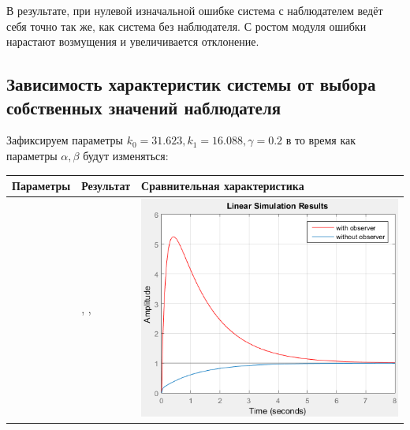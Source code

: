 \documentclass[14pt,a4paper,report]{report}
\begin{document}
В результате, при нулевой изначальной ошибке система с наблюдателем ведёт себя точно так же, как система без наблюдателя. С ростом модуля ошибки нарастают возмущения и увеличивается отклонение.

\subsection{Зависимость характеристик системы от выбора собственных значений наблюдателя}

Зафиксируем параметры $k_0=31.623, k_1=16.088, \gamma=0.2$  в то время как параметры $\alpha, \beta$ будут изменяться:

\begin{table}[h!]
	\centering
	\bgroup
	\def\arraystretch{3}
	\begin{tabular}{ | m{4cm} | m{4cm} | m{8cm} | }
		\hline
		Параметры & Результат & Сравнительная характеристика \\ \hline
		
		\text{$k_0=31.623$, $k_1=16.088$}\linebreak \text{$\alpha=-4$, $\beta=-8$, $\gamma=0.2$} & 
		\text{С наблюдателем:}\linebreak
		\text{$\Omega=5.6401$}, \text{$min(|Re(p_{1-4})|)=0.7846$} 
		\text{Без наблюдателя:}\linebreak
		\text{$\Omega=5.6234$}, \text{$min(|Re(p_{1-2})|)=0.7846$} & 
		\begin{minipage}{.3\textwidth}
			\includegraphics[scale = 0.46]{images/g1.png}
		\end{minipage}
		\\\hline
		

\end{tabular}
\end{table}
\end{document}
